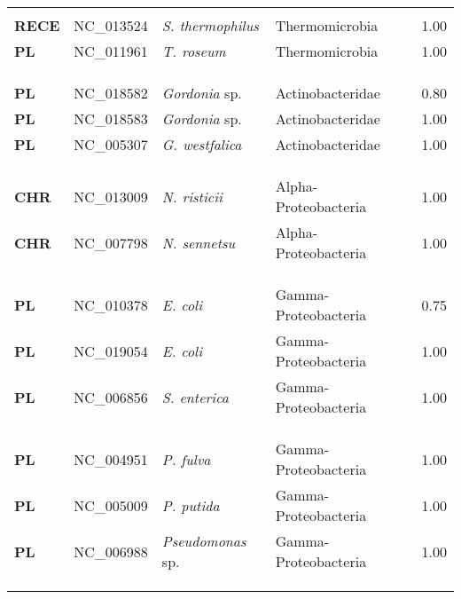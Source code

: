 \begin{adjustwidth}{-3cm}{2cm}
{\begin{supertabular}{>{\bfseries}l|p{0.1\textwidth}p{0.14\textwidth}l|l}
\hline\\
RECE & NC\_013524 & \textit{S. thermophilus} & Thermomicrobia & 1.00\\
PL & NC\_011961 & \textit{T. roseum} & Thermomicrobia & 1.00\\
\\
\\
\hline\\
PL & NC\_018582 & \textit{Gordonia} sp. & Actinobacteridae & 0.80\\
PL & NC\_018583 & \textit{Gordonia} sp. & Actinobacteridae & 1.00\\
PL & NC\_005307 & \textit{G. westfalica} & Actinobacteridae & 1.00\\
\\
\\
\hline\\
CHR & NC\_013009 & \textit{N. risticii} & Alpha-Proteobacteria & 1.00\\
CHR & NC\_007798 & \textit{N. sennetsu} & Alpha-Proteobacteria & 1.00\\
\\
\\
\hline\\
PL & NC\_010378 & \textit{E. coli} & Gamma-Proteobacteria & 0.75\\
PL & NC\_019054 & \textit{E. coli} & Gamma-Proteobacteria & 1.00\\
PL & NC\_006856 & \textit{S. enterica} & Gamma-Proteobacteria & 1.00\\
\\
\\
\hline\\
PL & NC\_004951 & \textit{P. fulva} & Gamma-Proteobacteria & 1.00\\
PL & NC\_005009 & \textit{P. putida} & Gamma-Proteobacteria & 1.00\\
PL & NC\_006988 & \textit{Pseudomonas} sp. & Gamma-Proteobacteria & 1.00\\
\\
\\
\hline\\

\end{supertabular}}
\end{adjustwidth}
